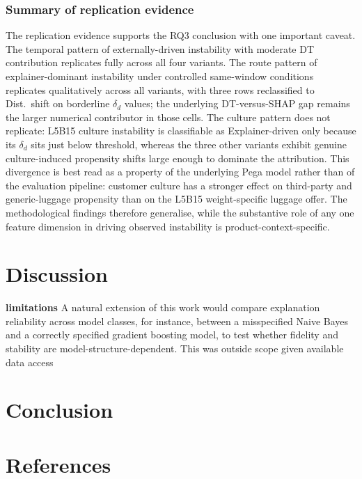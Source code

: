 \documentclass[oneside]{memoir} %
\begin{document}
\subsection{Summary of replication evidence}

The replication evidence supports the RQ3 conclusion with one important caveat. The temporal pattern of externally-driven instability with moderate DT contribution replicates fully across all four variants. The route pattern of explainer-dominant instability under controlled same-window conditions replicates qualitatively across all variants, with three rows reclassified to Dist.\ shift on borderline $\delta_d$ values; the underlying DT-versus-SHAP gap remains the larger numerical contributor in those cells. The culture pattern does not replicate: L5B15 culture instability is classifiable as Explainer-driven only because its $\delta_d$ sits just below threshold, whereas the three other variants exhibit genuine culture-induced propensity shifts large enough to dominate the attribution. This divergence is best read as a property of the underlying Pega model rather than of the evaluation pipeline: customer culture has a stronger effect on third-party and generic-luggage propensity than on the L5B15 weight-specific luggage offer. The methodological findings therefore generalise, while the substantive role of any one feature dimension in driving observed instability is product-context-specific.


\chapter{Discussion} \label{Discussion}
\textbf{limitations}
A natural extension of this work would compare explanation reliability across model classes, for instance, between a misspecified Naive Bayes and a correctly specified gradient boosting model, to test whether fidelity and stability are model-structure-dependent. This was outside scope given available data access

\chapter{Conclusion} \label{Conclusion}


\chapter{References} 
\linespread{1.25} %
\printbibliography[heading = none]
\end{document}
